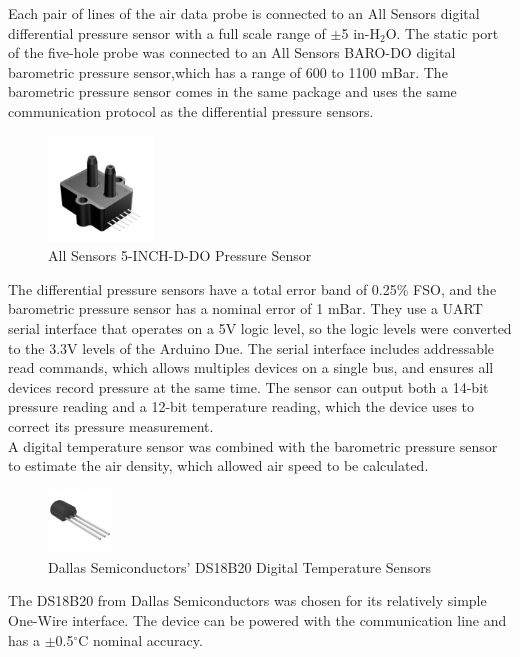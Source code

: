  Each pair of lines of the air data probe is connected to an All Sensors digital differential pressure sensor with a full scale range of $\pm$5 in-H$_2$O\cite{allsensorsDDO}. The static port of the five-hole probe was connected to an All Sensors BARO-DO digital barometric pressure sensor,which has a range of 600 to 1100 mBar\cite{allSensorsBaroDatasheet}. The barometric pressure sensor comes in the same package and uses the same communication protocol as the differential pressure sensors.

\begin{figure}[H]

  \centering
    \includegraphics[width=0.25\textwidth]{figures/allsensorsPressure.jpg}
      \caption{All Sensors 5-INCH-D-DO Pressure Sensor} \label{allsensorsPressurePic}
\end{figure}

The differential pressure sensors have a total error band of 0.25\% FSO, and the barometric pressure sensor has a nominal error of 1 mBar. They use a UART serial interface that operates on a 5V logic level, so the logic levels were converted to the 3.3V levels of the Arduino Due. The serial interface includes addressable read commands, which allows multiples devices on a single bus, and ensures all devices record pressure at the same time. The sensor can output both a 14-bit pressure reading and a 12-bit temperature reading, which the device uses to correct its pressure measurement.\\

A digital temperature sensor was combined with the barometric pressure sensor to estimate the air density, which allowed air speed to be calculated.

\begin{figure}[H]

  \centering
    \includegraphics[width=0.15\textwidth]{figures/ds18b20Picture.jpg}
  \caption{Dallas Semiconductors' DS18B20 Digital Temperature Sensors} \label{ds18b20Picture}
\end{figure}
 The DS18B20 from Dallas Semiconductors was chosen for its relatively simple One-Wire interface. The device can be powered with the communication line and has a $\pm$0.5$^\circ$C nominal accuracy\cite{DS18B20Datasheet}.

